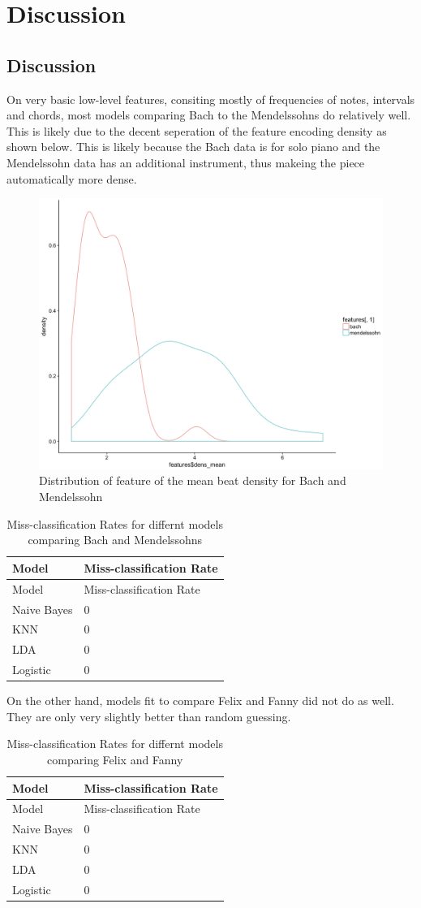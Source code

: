 \documentclass[12pt,twoside]{reedthesis}
\theoremstyle{definition}
\theoremstyle{definition}
\theoremstyle{definition}
\theoremstyle{remark}
\begin{document}
\chapter{Discussion}\label{discussion}

\section{Discussion}\label{discussion-1}

On very basic low-level features, consiting mostly of frequencies of
notes, intervals and chords, most models comparing Bach to the
Mendelssohns do relatively well. This is likely due to the decent
seperation of the feature encoding density as shown below. This is
likely because the Bach data is for solo piano and the Mendelssohn data
has an additional instrument, thus makeing the piece automatically more
dense.
\begin{figure}[h]
\centering
\includegraphics[scale = .5]{images/dens.png}
\caption{Distribution of feature of the mean beat density for Bach and Mendelssohn}
\label{subd}
\end{figure}
\begin{longtable}[]{@{}ll@{}}
\caption{Miss-classification Rates for differnt models comparing Bach
and Mendelssohns}\tabularnewline
\toprule
Model & Miss-classification Rate\tabularnewline
\midrule
\endfirsthead
\toprule
Model & Miss-classification Rate\tabularnewline
\midrule
\endhead
Naive Bayes & 0\tabularnewline
KNN & 0\tabularnewline
LDA & 0\tabularnewline
Logistic & 0\tabularnewline
\bottomrule
\end{longtable}
On the other hand, models fit to compare Felix and Fanny did not do as
well. They are only very slightly better than random guessing.
\begin{longtable}[]{@{}ll@{}}
\caption{Miss-classification Rates for differnt models comparing Felix
and Fanny}\tabularnewline
\toprule
Model & Miss-classification Rate\tabularnewline
\midrule
\endfirsthead
\toprule
Model & Miss-classification Rate\tabularnewline
\midrule
\endhead
Naive Bayes & 0\tabularnewline
KNN & 0\tabularnewline
LDA & 0\tabularnewline
Logistic & 0\tabularnewline
\bottomrule
\end{longtable}
\end{document}
